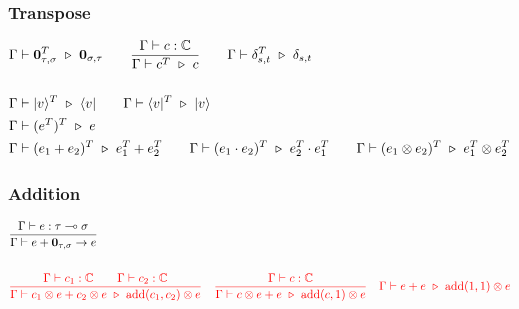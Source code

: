 \subsubsection*{Transpose}
\begin{align*}
  & \Gamma \vdash \textbf{0}_{\tau, \sigma}^T \ \triangleright\ \textbf{0}_{\sigma, \tau} 
  \qquad \frac{\Gamma \vdash c : \mathbb{C}}{\Gamma \vdash c^T \ \triangleright\ c}
  \qquad \Gamma \vdash \delta_{s,t}^T \ \triangleright\ \delta_{s,t} \\
  & \ \\
  & \Gamma \vdash \ket{v}^T \ \triangleright\ \bra{v} 
  \qquad \Gamma \vdash \bra{v}^T \ \triangleright\ \ket{v} \\
  & \Gamma \vdash (e^T)^T \ \triangleright\ e\\
  & \Gamma \vdash (e_1 + e_2)^T \ \triangleright\ e_1^T + e_2^T 
  \qquad \Gamma \vdash (e_1 \cdot e_2)^T \ \triangleright\ e_2^T \cdot e_1^T 
  \qquad \Gamma \vdash (e_1 \otimes e_2)^T \ \triangleright\ e_1^T \otimes e_2^T
\end{align*}


\subsubsection*{Addition}
\begin{align*}
  &
  \frac{\Gamma \vdash e : \tau \multimap \sigma}{\Gamma \vdash e + \textbf{0}_{\tau, \sigma}\to e}\\
  &\ \\
  & 
  \textcolor{red}{
  \frac{\Gamma \vdash c_1 : \mathbb{C} \qquad \Gamma \vdash c_2 : \mathbb{C}}
  {\Gamma \vdash c_1 \otimes e + c_2 \otimes e \ \triangleright\ \mathrm{add}(c_1, c_2) \otimes e}
  \quad 
  \frac{\Gamma \vdash c : \mathbb{C}}{\Gamma \vdash c \otimes e + e \ \triangleright\ \mathrm{add}(c, 1) \otimes e}
  \quad 
  \Gamma \vdash e + e \ \triangleright\ \mathrm{add}(1, 1) \otimes e}
\end{align*}

